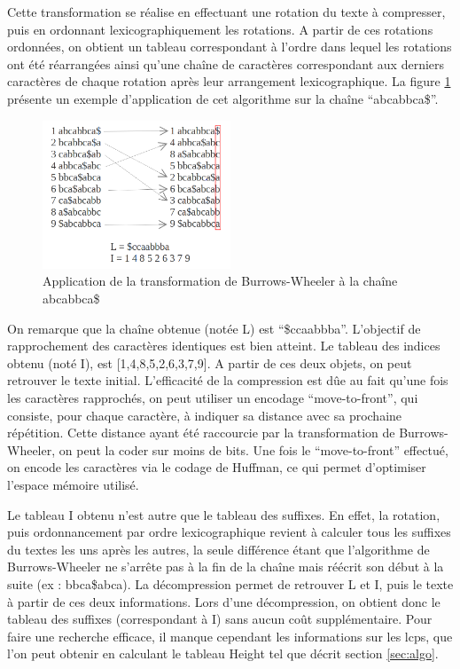 \documentclass[a4paper,11pt]{article}
\begin{document}
Cette transformation se réalise en effectuant une rotation du texte à
compresser, puis en ordonnant lexicographiquement les rotations. A
partir de ces rotations ordonnées, on obtient un tableau correspondant
à l'ordre dans lequel les rotations ont été réarrangées ainsi qu'une
chaîne de caractères correspondant aux derniers caractères de chaque
rotation après leur arrangement lexicographique. La figure
\ref{fig:burrows} présente un exemple d'application de cet algorithme
sur la chaîne ``abcabbca\$''. 

\begin{figure}[h]
  \centering
  \includegraphics[width=0.5\textwidth]{full_burrows}
  \caption{Application de la transformation de Burrows-Wheeler à la
    chaîne abcabbca\$}
  \label{fig:burrows}
\end{figure}


On remarque que la chaîne obtenue (notée L) est
``\$ccaabbba''. L'objectif de rapprochement des caractères identiques
est bien atteint. Le tableau des indices obtenu (noté I), est
[1,4,8,5,2,6,3,7,9]. A partir de ces deux objets, on peut retrouver le
texte initial. L'efficacité de la compression est dûe au fait qu'une
fois les caractères rapprochés, on peut utiliser un encodage
``move-to-front'', qui consiste, pour chaque caractère, à indiquer sa
distance avec sa prochaine répétition. Cette distance ayant été
raccourcie par la transformation de Burrows-Wheeler, on peut la coder
sur moins de bits. Une fois le ``move-to-front'' effectué, on encode
les caractères via le codage de Huffman, ce qui permet d'optimiser
l'espace mémoire utilisé.

Le tableau I obtenu n'est autre que le tableau des suffixes. En effet,
la rotation, puis ordonnancement par ordre lexicographique revient à
calculer tous les suffixes du textes les uns après les autres, la
seule différence étant que l'algorithme de Burrows-Wheeler ne s'arrête
pas à la fin de la chaîne mais réécrit son début à la suite (ex :
bbca\$abca). La décompression permet de retrouver L et I, puis le
texte à partir de ces deux informations. Lors d'une décompression, on
obtient donc le tableau des suffixes (correspondant à I) sans aucun
coût supplémentaire. Pour faire une recherche efficace, il manque
cependant les informations sur les lcps, que l'on peut obtenir en
calculant le tableau Height tel que décrit section \ref{sec:algo}.
\end{document}
